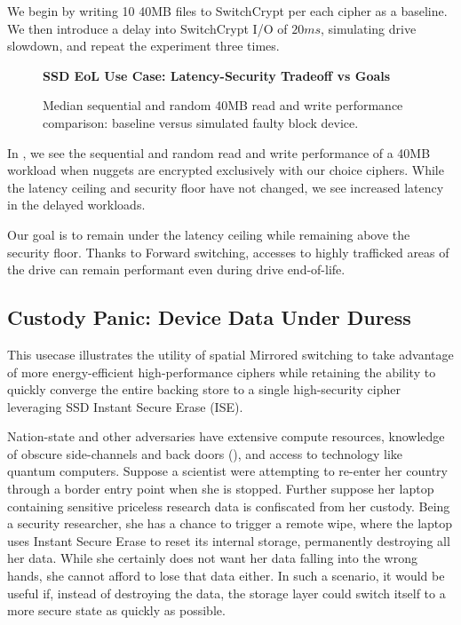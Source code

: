 We begin by writing 10 40MB files to SwitchCrypt per each cipher as a baseline.
We then introduce a delay into SwitchCrypt I/O of $20ms$, simulating drive
slowdown, and repeat the experiment three times.

\begin{figure}[ht] \textbf{SSD EoL Use Case: Latency-Security Tradeoff vs
   Goals}\par\medskip
   {} \caption{Median sequential and
   random 40MB read and write performance comparison: baseline versus simulated
   faulty block device.}
  \label{fig:usecase-eol-tradeoff}
\end{figure}

In , we see the sequential and random read and
write performance of a 40MB workload when nuggets are encrypted exclusively with
our choice ciphers. While the latency ceiling and security floor have not
changed, we see increased latency in the delayed workloads.

Our goal is to remain under the latency ceiling while remaining above the
security floor. Thanks to Forward switching, accesses to highly trafficked areas
of the drive can remain performant even during drive end-of-life.

\subsection{Custody Panic: Device Data Under Duress}\label{subsec:uc4}

This usecase illustrates the utility of spatial Mirrored switching to take
advantage of more energy-efficient high-performance ciphers while retaining the
ability to quickly converge the entire backing store to a single high-security
cipher leveraging SSD Instant Secure Erase (ISE).

Nation-state and other adversaries have extensive compute resources, knowledge
of obscure side-channels and back doors (),
and access to technology like quantum computers. Suppose a scientist were
attempting to re-enter her country through a border entry point when she is
stopped. Further suppose her laptop containing sensitive priceless research data
is confiscated from her custody. Being a security researcher, she has a chance
to trigger a remote wipe, where the laptop uses Instant Secure Erase to reset
its internal storage, permanently destroying all her data. While she certainly
does not want her data falling into the wrong hands, she cannot afford to lose
that data either. In such a scenario, it would be useful if, instead of
destroying the data, the storage layer could switch itself to a more secure
state as quickly as possible.

